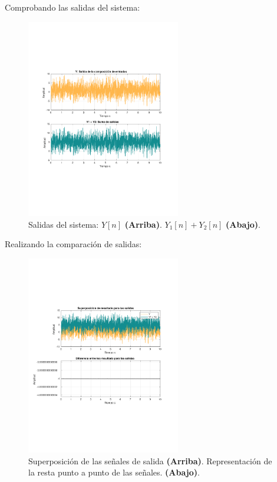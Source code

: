 			Comprobando las salidas del sistema:
			\begin{figure}[H]
				\center
				\includegraphics[width=0.6\textwidth,clip, trim = {2cm 7.0cm 2.2cm 7.0cm}]{../imgs/sistema_2_linealidad_salidas.pdf}
				\caption{Salidas del sistema: $Y[n]$ \textbf{(Arriba)}. $Y_{1}[n] + Y_{2}[n]$ \textbf{(Abajo)}.}
				\label{fig:s_2_lineality_outputs}	
			\end{figure}
\newpage
			Realizando la comparación de salidas:
			\begin{figure}[H]
				\center
				\includegraphics[width=0.6\textwidth,clip, trim = {2cm 7.0cm 2.2cm 7.0cm}]{../imgs/sistema_2_linealidad_superpuestas.pdf}
				\caption{Superposición de las señales de salida \textbf{(Arriba)}. Representación de la resta punto a punto de las señales. \textbf{(Abajo)}.}
				\label{fig:s_2_lineality_superposition}
			\end{figure}
		
